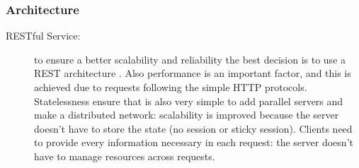 \documentclass[a4paper]{article}
\begin{document}
    \subsubsection{Architecture}
    \begin{description}
        \item[RESTful Service:] to ensure a better scalability and reliability the best decision is to use a REST architecture \cite{archroyfielding}. Also performance is an important factor, and this is achieved due to requests following the simple HTTP protocols. Statelessness ensure that is also very simple to add parallel servers and make a distributed network: scalability is improved because the server doesn't have to store the state (no session or sticky session). Clients need to provide every information necessary in each request: the server doesn't have to manage resources across requests.
    \end{description}
\end{document}
